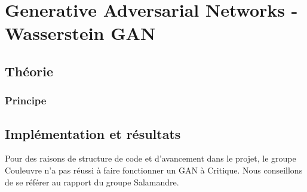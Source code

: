 \chapter{Generative Adversarial Networks - Wasserstein GAN}
\section{Théorie}
\subsection{Principe}

\section{Implémentation et résultats}
Pour des raisons de structure de code et d'avancement dans le projet, le groupe Couleuvre n'a pas réussi à faire fonctionner un GAN à Critique. Nous conseillons de se référer au rapport du groupe Salamandre.